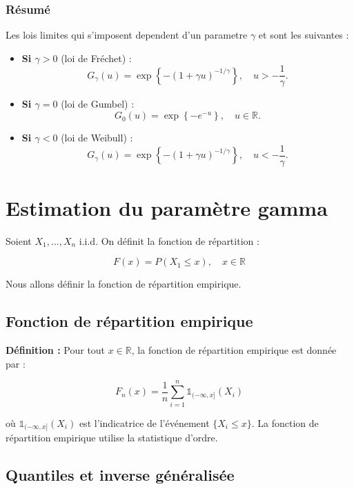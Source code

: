 \documentclass{article}
\begin{document}
\subsubsection{Résumé}
Les lois limites qui s'imposent dependent d'un parametre $\gamma$ et sont les suivantes :
\\
\begin{itemize}
    \item \textbf{Si \(\gamma>0\)} (loi de Fréchet) :
    \[
    G_\gamma(u)=\exp\left\{-\left(1+\gamma u\right)^{-1/\gamma}\right\}, \quad u > -\frac{1}{\gamma}.
    \]
    
    \item \textbf{Si \(\gamma=0\)} (loi de Gumbel) :
    \[
    G_0(u)=\exp\left\{-e^{-u}\right\}, \quad u\in\mathbb{R}.
    \]
    
    \item \textbf{Si \(\gamma<0\)} (loi de Weibull) :
    \[
    G_\gamma(u)=\exp\left\{-\left(1+\gamma u\right)^{-1/\gamma}\right\}, \quad u < -\frac{1}{\gamma}.
    \]
\end{itemize}

\newpage
\section{Estimation du paramètre gamma} 

Soient \(X_1, \dots, X_n\) i.i.d. On définit la fonction de répartition :

\[
F(x) = P(X_1 \leq x), \quad x \in \mathbb{R}
\]

Nous allons définir la fonction de répartition empirique.

\subsection{Fonction de répartition empirique}

\textbf{Définition :} Pour tout \(x \in \mathbb{R}\), la fonction de répartition empirique est donnée par :

\[
F_n(x) = \frac{1}{n} \sum_{i=1}^{n} \mathbb{1}_{(-\infty, x]}(X_i)
\]

où \(\mathbb{1}_{(-\infty, x]}(X_i)\) est l'indicatrice de l'événement \(\{X_i \leq x\}\).
La fonction de répartition empirique utilise la statistique d'ordre.

\subsection{Quantiles et inverse généralisée}
\end{document}
